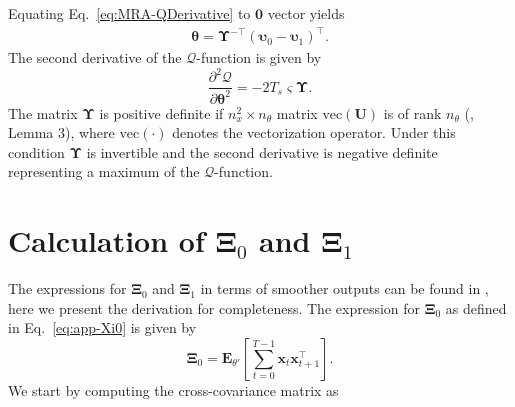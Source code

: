 \documentclass[review,authoryear,3p]{elsarticle}
\begin{document}
Equating Eq.~\eqref{eq:MRA-QDerivative} to $\mathbf 0$ vector yields
\begin{align}\label{eq:app-thetahat}
\boldsymbol \theta= \boldsymbol\Upsilon^{-\top}(\boldsymbol\upsilon_0-\boldsymbol\upsilon_1)^\top.
\end{align}
The second derivative of the $\mathcal Q$-function is given by
\begin{equation}
\frac{\partial^2\mathcal Q}{\partial\boldsymbol\theta^2}=-2T_s\varsigma\boldsymbol\Upsilon.
\end{equation}
The matrix $\boldsymbol\Upsilon$ is positive definite if $n_x^2\times n_{\theta}$ matrix $\mathrm{vec}(\mathbf U)$ is of rank $n_{\theta}$ (\citep{Dewar2009}, Lemma 3), where $\mathrm{vec}(\cdot)$ denotes the vectorization operator. Under this condition $\boldsymbol\Upsilon$ is  invertible and the second derivative is negative definite representing a maximum of the $\mathcal Q$-function.  
\section{Calculation of $\boldsymbol\Xi_{0}$ and $\boldsymbol\Xi_{1}$}\label{ap:Xiderivation}
The expressions for $\boldsymbol\Xi_{0}$ and $\boldsymbol\Xi_{1}$ in terms of smoother outputs can be found in \cite{Shumway2000}, here we present the derivation for completeness.  The expression for  $\boldsymbol\Xi_{0}$ as defined in Eq.~\eqref{eq:app-Xi0} is given by
   \begin{equation}\label{eq:appXi0}
	 \boldsymbol\Xi_0=\mathbf E_{\theta'}\left[\sum_{t=0}^{T-1}\mathbf x_t\mathbf x_{t+1}^\top\right].
	\end{equation}                                                                                                
	We start by computing the cross-covariance matrix as 
	
\end{document}
